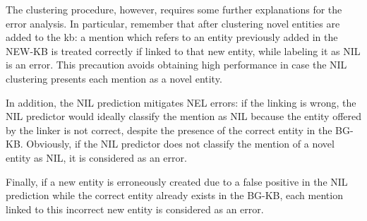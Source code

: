 The clustering procedure, however, requires some further explanations for the error analysis.
In particular, remember that after clustering novel entities are added to the \ac{kb}:
a mention which refers to an entity previously added in the NEW-KB is treated correctly if linked to that new entity, while labeling it as NIL is an error.
This precaution avoids obtaining high performance in case the NIL clustering presents each mention as a novel entity.


In addition, the NIL prediction mitigates NEL errors: if the linking is wrong, the NIL predictor would ideally classify the mention as NIL because the entity offered by the linker is not correct, despite the presence of the correct entity in the BG-KB.
Obviously, if the NIL predictor does not classify the mention of a novel entity as NIL, it is considered as an error.


Finally, if a new entity is erroneously created due to a false positive in the NIL prediction while the correct entity already exists in the BG-KB, each mention linked to this incorrect new entity is considered as an error.


